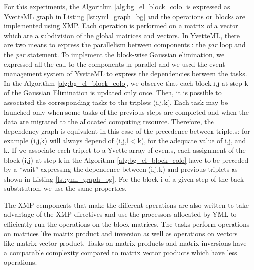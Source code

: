 For this experiments, the Algorithm \ref{alg:bg_el_block_colo} is expressed as YvetteML graph in Listing \ref{lst:yml_graph_bg} and the operations on blocks are implemented using XMP.
Each operation is performed on a matrix of a vector which are a subdivision of the global matrices and vectors.
In YvetteML, there are two means to express the parallelism between components : the \textit{par} loop and the \textit{par} statement.
To implement the block-wise Gaussian elimination, we expressed all the call to the components in parallel and we used the event management system of YvetteML to express the dependencies between the tasks.
In the Algorithm \ref{alg:bg_el_block_colo}, we observe that each block i,j at step k of the Gaussian Elimination is updated only once.
Then, it is possible to associated the corresponding tasks to the triplets (i,j,k).
Each task may be launched only when some tasks of the previous steps are completed and when the data are migrated to the allocated computing resource.
Therefore, the dependency graph is equivalent in this case of the precedence between triplets: for example (i,j,k) will always depend of (i,j,l$<$k), for the adequate value of i,j, and k.
If we associate each triplet to a Yvette array of events, each assignment of the block (i,j) at step k in the Algorithm \ref{alg:bg_el_block_colo} have to be preceded by a “wait” expressing the dependence between (i,j,k) and previous triplets as shown in Listing \ref{lst:yml_graph_bg}.
For the block i of a given step  of the back substitution, we use the same properties.



The XMP components that make the different operations are also written to take advantage of the XMP directives and use the processors allocated by YML to efficiently run the operations on the block matrices.
The tasks perform operations on matrices like matrix product and inversion as well as operations on vectors like matrix vector product.
Tasks on matrix products and matrix inversions have a comparable complexity compared to matrix vector products which have less operations.

